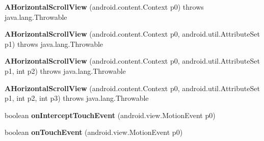 \begin{DoxyCompactItemize}
\item 
\mbox{\label{classmd5b60ffeb829f638581ab2bb9b1a7f4f3f_1_1_a_horizontal_scroll_view_af5243d774c5a226c8d990803ca71be44}} 
{\bfseries A\+Horizontal\+Scroll\+View} (android.\+content.\+Context p0)  throws java.\+lang.\+Throwable 	
\item 
\mbox{\label{classmd5b60ffeb829f638581ab2bb9b1a7f4f3f_1_1_a_horizontal_scroll_view_a152d1e31c4cbb0b713c94c701d37a586}} 
{\bfseries A\+Horizontal\+Scroll\+View} (android.\+content.\+Context p0, android.\+util.\+Attribute\+Set p1)  throws java.\+lang.\+Throwable 	
\item 
\mbox{\label{classmd5b60ffeb829f638581ab2bb9b1a7f4f3f_1_1_a_horizontal_scroll_view_a39296f4d2bb34f96db535ce39d024d99}} 
{\bfseries A\+Horizontal\+Scroll\+View} (android.\+content.\+Context p0, android.\+util.\+Attribute\+Set p1, int p2)  throws java.\+lang.\+Throwable 	
\item 
\mbox{\label{classmd5b60ffeb829f638581ab2bb9b1a7f4f3f_1_1_a_horizontal_scroll_view_a0d9f33e5410003f982e1bddcb71639df}} 
{\bfseries A\+Horizontal\+Scroll\+View} (android.\+content.\+Context p0, android.\+util.\+Attribute\+Set p1, int p2, int p3)  throws java.\+lang.\+Throwable 	
\item 
\mbox{\label{classmd5b60ffeb829f638581ab2bb9b1a7f4f3f_1_1_a_horizontal_scroll_view_a316c95b751f0a5c1adea69370d5325f2}} 
boolean {\bfseries on\+Intercept\+Touch\+Event} (android.\+view.\+Motion\+Event p0)
\item 
\mbox{\label{classmd5b60ffeb829f638581ab2bb9b1a7f4f3f_1_1_a_horizontal_scroll_view_aa8fe4de3af4981fca3ea1efa4d423798}} 
boolean {\bfseries on\+Touch\+Event} (android.\+view.\+Motion\+Event p0)
\item 
\mbox{\label{classmd5b60ffeb829f638581ab2bb9b1a7f4f3f_1_1_a_horizontal_scroll_view_a308c3a91c514c6d38d0b97ea55e0e988}} 

\end{DoxyCompactItemize}
